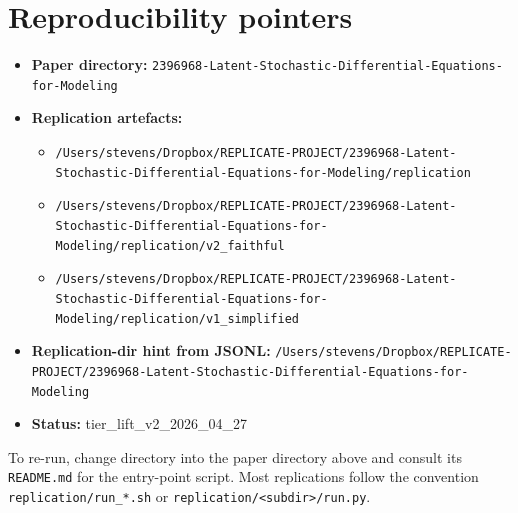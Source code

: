 \documentclass[11pt]{article}
\begin{document}
\section{Reproducibility pointers}\label{sec:repro}
\begin{itemize}
\item \textbf{Paper directory:} \texttt{2396968-Latent-Stochastic-Differential-Equations-for-Modeling}
\item \textbf{Replication artefacts:}
\begin{itemize}
\item \texttt{/Users/stevens/Dropbox/REPLICATE-PROJECT/2396968-Latent-Stochastic-Differential-Equations-for-Modeling/replication}
\item \texttt{/Users/stevens/Dropbox/REPLICATE-PROJECT/2396968-Latent-Stochastic-Differential-Equations-for-Modeling/replication/v2\_faithful}
\item \texttt{/Users/stevens/Dropbox/REPLICATE-PROJECT/2396968-Latent-Stochastic-Differential-Equations-for-Modeling/replication/v1\_simplified}
\end{itemize}
\item \textbf{Replication-dir hint from JSONL:} \texttt{/Users/stevens/Dropbox/REPLICATE-PROJECT/2396968-Latent-Stochastic-Differential-Equations-for-Modeling}
\item \textbf{Status:} tier\_lift\_v2\_2026\_04\_27
\end{itemize}

To re-run, change directory into the paper directory above and consult its \texttt{README.md} for the entry-point script. Most replications follow the convention \texttt{replication/run\_*.sh} or \texttt{replication/<subdir>/run.py}.
\end{document}
